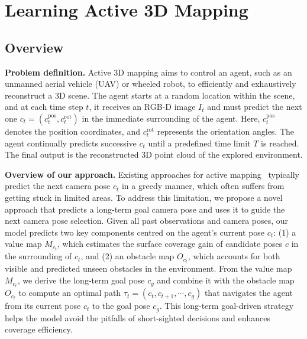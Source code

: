 \newcommand{\GT}{\text{GT}}
\newcommand{\cov}{\text{Cov}}
\newcommand{\pos}{\text{pos}}
\newcommand{\rot}{\text{rot}}
\newcommand{\MSE}{\text{MSE}}
\newcommand{\BCE}{\text{BCE}}

\section{Learning Active 3D Mapping}

\subsection{Overview}

\noindent \textbf{Problem definition.}
%
Active 3D mapping aims to control an agent, such as an unmanned aerial vehicle (UAV) or wheeled robot, to efficiently and exhaustively reconstruct a 3D scene.
The agent starts at a random location within the scene, and at each time step $t$, it receives an RGB-D image $I_t$ and must predict the next one $c_t = (c^\pos_t, c^\rot_t)$ in the immediate surrounding of the agent.
Here, $c^\pos_t$ denotes the position coordinates, and $c^\rot_t$ represents the orientation angles. 
The agent continually predicts successive $c_t$ until a predefined time limit $T$ is reached. The final output is the reconstructed 3D point cloud of the explored environment.


\noindent \textbf{Overview of our approach.}
%
Existing approaches for active mapping~\citep{guedon2022scone,guedon2023macarons} typically predict the next camera pose $c_t$ in a greedy manner, which often suffers from getting stuck in limited areas.
To address this limitation, we propose a novel approach that predicts a long-term goal camera pose and uses it to guide the next camera pose selection.
%
Given all past observations and camera poses, our model predicts two key components centred on the agent's current pose $c_t$: 
(1) a value map $M_{c_t}$, which estimates the surface coverage gain of candidate poses $c$ in the surrounding of $c_t$, and 
(2) an obstacle map $O_{c_t}$, which accounts for both visible and predicted unseen obstacles in the environment. 
From the value map $M_{c_t}$, we derive the long-term goal pose $c_g$ and combine it with the obstacle map $O_{c_t}$ to compute an optimal path $\tau_t = (c_t, c_{t+1}, \cdots, c_g)$ that navigates the agent from its current pose $c_t$ to the goal pose $c_g$.
This long-term goal-driven strategy helps the model avoid the pitfalls of short-sighted decisions and enhances coverage efficiency.

